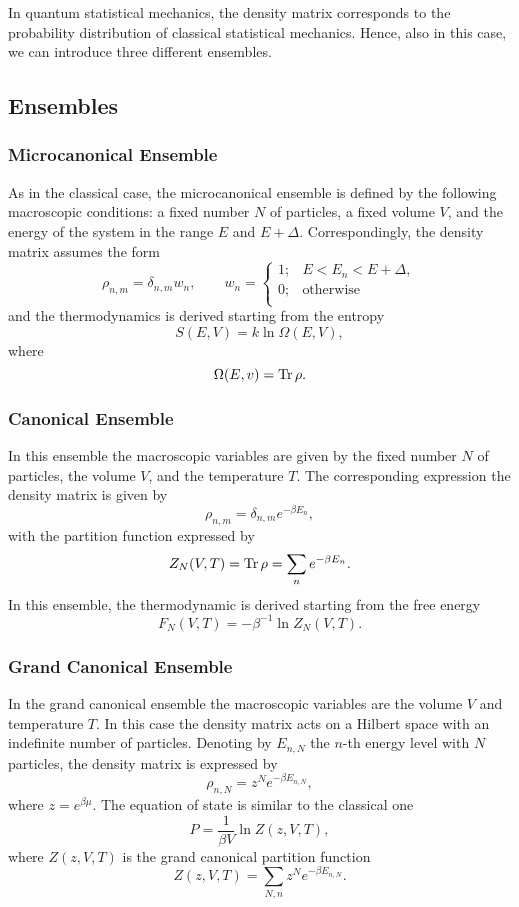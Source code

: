 \documentclass[10pt]{article}
\begin{document}
	In quantum statistical mechanics, the density matrix corresponds to the probability distribution of classical statistical mechanics. Hence, also in this case, we can introduce three different ensembles.
	\subsection{Ensembles}
	\subsubsection{Microcanonical Ensemble}
	As in the classical case, the microcanonical ensemble is defined by the following macroscopic conditions: a fixed number $N$ of particles, a fixed volume $V$, and the energy of the system in the range $E$ and $E+\Delta$. Correspondingly, the density matrix assumes the form 
	$$\rho_{n,m}=\delta_{n,m}w_n,\qquad w_n=\begin{cases}
	1; &E<E_n<E+\Delta,\\
	0; &\text{otherwise}\\
	\end{cases}$$
	and the thermodynamics is derived starting from the entropy
	$$S(E,V)=k\ln\Omega(E,V),$$
	where $$\Omega(E,v)=\Tr\rho.$$
	\subsubsection{Canonical Ensemble}
	In this ensemble the macroscopic variables are given by the fixed number $N$ of particles, the volume $V$, and the temperature $T$. The corresponding expression the density matrix is given by  
	$$\rho_{n,m}=\delta_{n,m}e^{-\beta E_n},$$
	with the partition function expressed by 
	$$Z_N(V,T)=\Tr\rho=\sum_ne^{-\beta E_n}.$$ 
	In this ensemble, the thermodynamic is derived starting from the free energy 
	$$F_N(V,T)=-\beta^{-1}\ln Z_N(V,T).$$
	\subsubsection{Grand Canonical Ensemble}
	In the grand canonical ensemble the macroscopic variables are the volume $V$ and temperature $T$. In this case the density matrix acts on a Hilbert space with an indefinite number of particles. Denoting by $E_{n,N}$ the $n$-th energy level with $N$ particles, the density matrix is expressed by 
	$$\rho_{n,N}=z^Ne^{-\beta E_{n,N}},$$
	where $z=e^{\beta\mu}$. The equation of state is similar to the classical one $$P=\frac{1}{\beta V}\ln Z(z,V,T),$$
	where $Z(z,V,T)$ is the grand canonical partition function 
	$$Z(z,V,T)=\sum_{N,n}z^Ne^{-\beta E_{n,N}}.$$
\end{document}
